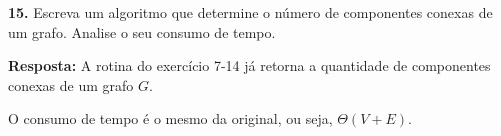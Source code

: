 
\noindent\textbf{15.} Escreva um algoritmo que determine o número de componentes conexas de um grafo. Analise o seu consumo de tempo.

\textbf{Resposta:} A rotina  do exercício 7-14 já retorna a quantidade de componentes conexas de um grafo $G$.

O consumo de tempo é o mesmo da  original, ou seja, $\Theta(V + E)$.\\[6pt]